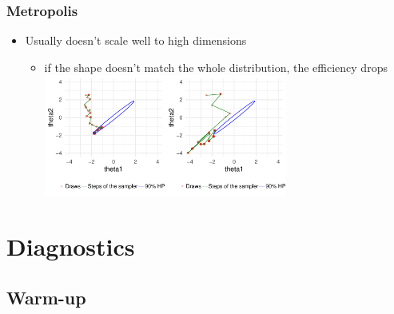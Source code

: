 \documentclass[10pt]{beamer}
\begin{document}
\begin{frame}

\frametitle{ Metropolis}

  \begin{itemize}
  \item Usually doesn't scale well to high dimensions
    \begin{itemize}
    \item if the shape doesn't match the whole distribution, the efficiency drops
      \vspace{1\baselineskip}
      \hspace{-1cm}\includegraphics[width=4cm]{figs/Metrop2.pdf}\includegraphics[width=4cm]{figs/Metrop3.pdf}
    \end{itemize}
  \end{itemize}

\end{frame}

\section{Diagnostics}

\subsection{Warm-up}
\end{document}
